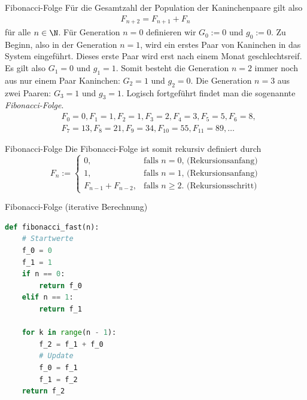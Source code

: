 \begin{frame}[fragile]{Fibonacci-Folge}
Für die Gesamtzahl der Population der Kaninchenpaare gilt also
\begin{align*}
    F_{n+2} = F_{n+1} + F_{n}
\end{align*}
für alle $n\in\N$. Für Generation $n=0$ definieren wir $G_0:=0$ und $g_0:=0$. Zu Beginn, also in der Generation $n=1$, wird ein erstes Paar von Kaninchen in das System eingeführt. Dieses erste Paar wird erst nach einem Monat geschlechtsreif. Es gilt also $G_1=0$ und $g_1=1$. Somit besteht die Generation $n=2$ immer noch aus nur einem Paar Kaninchen: $G_2=1$ und $g_2=0$. Die Generation $n=3$ aus zwei Paaren: $G_3=1$ und $g_3=1$. Logisch fortgeführt findet man die sogenannte \textit{Fibonacci-Folge}.
\begin{align*}
    &F_0 = 0, F_1 = 1, F_2 = 1, F_3 = 2, F_4 = 3, F_5 = 5, F_6 = 8,\\
    &F_7 = 13, F_8 = 21, F_9 = 34, F_{10} = 55, F_{11} = 89, \ldots
\end{align*}
\end{frame}

\begin{frame}[fragile]{Fibonacci-Folge}
Die Fibonacci-Folge ist somit rekursiv definiert durch
\[
  F_n := 
  \begin{cases}
    0, &\text{falls $n=0$, (Rekursionsanfang)} \\
    1, &\text{falls $n=1$, (Rekursionsanfang)} \\
    F_{n-1} + F_{n-2}, & \text{falls  $n\geq 2$. (Rekursionsschritt)}
  \end{cases}
\]
\end{frame}

\begin{frame}[fragile]{Fibonacci-Folge (iterative Berechnung)}
\begin{lstlisting}[language=Python,caption=iterative Berechnung der Fibonacci-Folge]
def fibonacci_fast(n):
    # Startwerte
    f_0 = 0
    f_1 = 1
    if n == 0:
        return f_0
    elif n == 1:
        return f_1
    
    for k in range(n - 1):
        f_2 = f_1 + f_0
        # Update
        f_0 = f_1
        f_1 = f_2
    return f_2
\end{lstlisting}
\end{frame}

